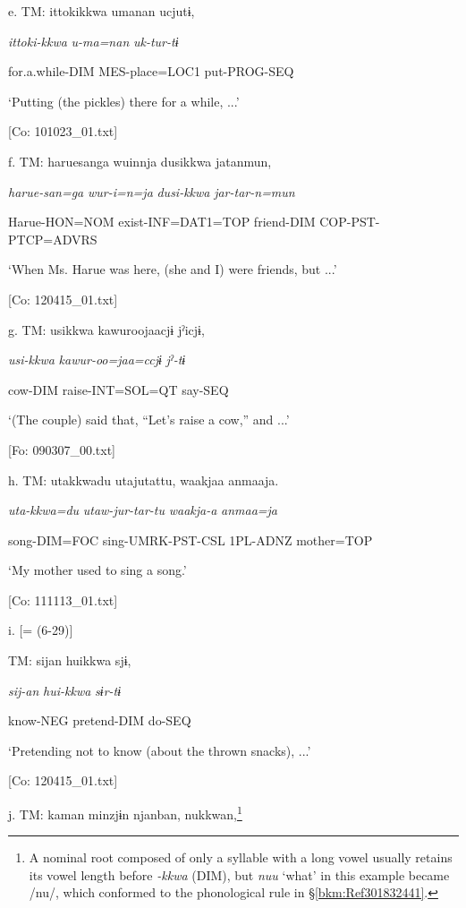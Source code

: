   e.  TM:  {\textbar}ittoki{\textbar}kkwa  umanan  ucjutɨ,

      \textit{ittoki-kkwa}  \textit{u-ma=nan}  \textit{uk-tur-tɨ}

      for.a.while-DIM  MES-place=LOC1  put-PROG-SEQ

      ‘Putting (the pickles) there for a while, ...’

      [Co: 101023\_01.txt]

  f.  TM:  haruesanga  wuinnja  dusikkwa  jatanmun,

      \textit{harue-san=ga}  \textit{wur-i=n=ja}  \textit{dusi-kkwa}  \textit{jar-tar-n=mun}

      Harue-HON=NOM  exist{}-INF=DAT1=TOP  friend-DIM  COP-PST-PTCP=ADVRS

      ‘When Ms. Harue was here, (she and I) were friends, but ...’

      [Co: 120415\_01.txt]

  g.  TM:  usikkwa  kawuroojaacjɨ  jˀicjɨ,

      \textit{usi-kkwa}  \textit{kawur-oo=jaa=ccjɨ}  \textit{jˀ-tɨ}

      cow-DIM  raise-INT=SOL=QT  say-SEQ

      ‘(The couple) said that, “Let’s raise a cow,” and ...’

      [Fo: 090307\_00.txt]

  h.  TM:  utakkwadu  utajutattu,  waakjaa  anmaaja.

      \textit{uta-kkwa=du}  \textit{utaw-jur-tar-tu}  \textit{waakja-a}  \textit{anmaa=ja}

      song-DIM=FOC  sing-UMRK-PST-CSL  1PL-ADNZ  mother=TOP

      ‘My mother used to sing a song.’

      [Co: 111113\_01.txt]

  i.  [= (6-29)]

    TM:  sijan  huikkwa  sjɨ,

      \textit{sij-an}  \textit{hui-kkwa}  \textit{sɨr-tɨ}

      know-NEG  pretend-DIM  do-SEQ

      ‘Pretending not to know (about the thrown snacks), ...’

      [Co: 120415\_01.txt]

  j.  TM:  kaman  minzjɨn  njanban,  nukkwan,\footnote{A nominal root composed of only a syllable with a long vowel usually retains its vowel length before \textit{-kkwa} (DIM), but \textit{nuu} ‘what’ in this example became /nu/, which conformed to the phonological rule in §\ref{bkm:Ref301832441}.}

